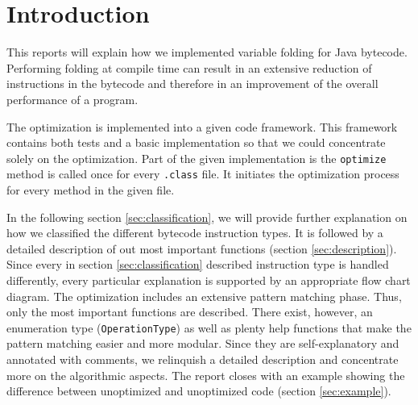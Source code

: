 \section{Introduction}

This reports will explain how we implemented variable folding for Java bytecode. Performing folding at compile time can result in an extensive reduction of instructions in the bytecode and therefore in an improvement of the overall performance of a program.

The optimization is implemented into a given code framework. This framework contains both tests and a basic implementation so that we could concentrate solely on the optimization. Part of the given implementation is the \texttt{optimize} method is called once for every \texttt{.class} file. It initiates the optimization process for every method in the given file. 

In the following section \ref{sec:classification}, we will provide further explanation on how we classified the different bytecode instruction types. It is followed by a detailed description of out most important functions (section \ref{sec:description}). Since every in section \ref{sec:classification} described instruction type is handled differently, every particular explanation is supported by an appropriate flow chart diagram. The optimization includes an extensive pattern matching phase. Thus, only the most important functions are described. There exist, however, an enumeration type (\texttt{OperationType}) as well as plenty help functions that make the pattern matching easier and more modular. Since they are self-explanatory and annotated with comments, we relinquish a detailed description and concentrate more on the algorithmic aspects. The report closes with an example showing the difference between unoptimized and unoptimized code (section \ref{sec:example}).